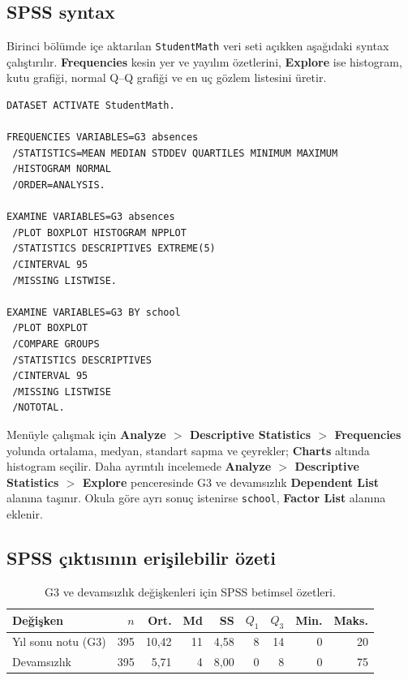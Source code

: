 \subsection{SPSS syntax}

Birinci bölümde içe aktarılan \texttt{StudentMath} veri seti açıkken aşağıdaki
syntax çalıştırılır. \textbf{Frequencies} kesin yer ve yayılım özetlerini,
\textbf{Explore} ise histogram, kutu grafiği, normal Q--Q grafiği ve en uç
gözlem listesini üretir.

\begin{lstlisting}[language={}]
DATASET ACTIVATE StudentMath.

FREQUENCIES VARIABLES=G3 absences
 /STATISTICS=MEAN MEDIAN STDDEV QUARTILES MINIMUM MAXIMUM
 /HISTOGRAM NORMAL
 /ORDER=ANALYSIS.

EXAMINE VARIABLES=G3 absences
 /PLOT BOXPLOT HISTOGRAM NPPLOT
 /STATISTICS DESCRIPTIVES EXTREME(5)
 /CINTERVAL 95
 /MISSING LISTWISE.

EXAMINE VARIABLES=G3 BY school
 /PLOT BOXPLOT
 /COMPARE GROUPS
 /STATISTICS DESCRIPTIVES
 /CINTERVAL 95
 /MISSING LISTWISE
 /NOTOTAL.
\end{lstlisting}

Menüyle çalışmak için \textbf{Analyze $>$ Descriptive Statistics $>$
Frequencies} yolunda ortalama, medyan, standart sapma ve çeyrekler;
\textbf{Charts} altında histogram seçilir. Daha ayrıntılı incelemede
\textbf{Analyze $>$ Descriptive Statistics $>$ Explore} penceresinde G3 ve
devamsızlık \textbf{Dependent List} alanına taşınır. Okula göre ayrı sonuç
istenirse \texttt{school}, \textbf{Factor List} alanına eklenir.

\subsection{SPSS çıktısının erişilebilir özeti}

\begin{table}[htbp]
\centering
\caption{G3 ve devamsızlık değişkenleri için SPSS betimsel özetleri.}
\begin{tabular}{@{}lrrrrrrrr@{}}
\toprule
Değişken & $n$ & Ort. & Md & SS & $Q_1$ & $Q_3$ & Min. & Maks. \\
\midrule
Yıl sonu notu (G3) & 395 & 10,42 & 11 & 4,58 & 8 & 14 & 0 & 20 \\
Devamsızlık & 395 & 5,71 & 4 & 8,00 & 0 & 8 & 0 & 75 \\
\bottomrule
\end{tabular}
\end{table}


